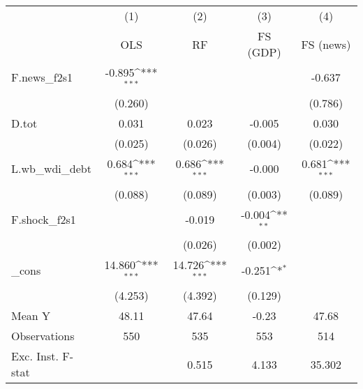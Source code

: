 {
\def\sym#1{\ifmmode^{#1}\else\(^{#1}\)\fi}
\begin{tabular}{l*{4}{c}}
\toprule
            &\multicolumn{1}{c}{(1)}&\multicolumn{1}{c}{(2)}&\multicolumn{1}{c}{(3)}&\multicolumn{1}{c}{(4)}\\
            &\multicolumn{1}{c}{OLS}&\multicolumn{1}{c}{RF}&\multicolumn{1}{c}{FS (GDP)}&\multicolumn{1}{c}{FS (news)}\\
\midrule
F.news\_f2s1 &      -0.895\sym{***}&                     &                     &      -0.637         \\
            &     (0.260)         &                     &                     &     (0.786)         \\
\addlinespace
D.tot       &       0.031         &       0.023         &      -0.005         &       0.030         \\
            &     (0.025)         &     (0.026)         &     (0.004)         &     (0.022)         \\
\addlinespace
L.wb\_wdi\_debt&       0.684\sym{***}&       0.686\sym{***}&      -0.000         &       0.681\sym{***}\\
            &     (0.088)         &     (0.089)         &     (0.003)         &     (0.089)         \\
\addlinespace
F.shock\_f2s1&                     &      -0.019         &      -0.004\sym{**} &                     \\
            &                     &     (0.026)         &     (0.002)         &                     \\
\addlinespace
\_cons      &      14.860\sym{***}&      14.726\sym{***}&      -0.251\sym{*}  &                     \\
            &     (4.253)         &     (4.392)         &     (0.129)         &                     \\
\midrule
Mean Y      &       48.11         &       47.64         &       -0.23         &       47.68         \\
Observations&         550         &         535         &         553         &         514         \\
Exc. Inst. F-stat&                     &       0.515         &       4.133         &      35.302         \\
\bottomrule
\end{tabular}
}
